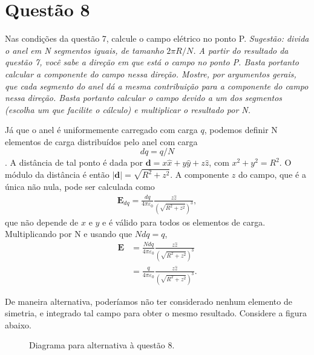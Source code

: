 \documentclass[11pt]{article}
\begin{document}
\section{Questão 8}
\label{sec:orgd01e726}
Nas condições da questão 7, calcule o campo elétrico no ponto
P. \emph{Sugestão: divida o anel em N segmentos iguais, de tamanho}
\emph{\(2\pi R/N\). A partir do resultado da questão 7, você sabe a direção em}
\emph{que está o campo no ponto P. Basta portanto calcular a componente do}
\emph{campo nessa direção. Mostre, por argumentos gerais, que cada segmento do}
\emph{anel dá a mesma contribuição para a componente do campo nessa}
\emph{direção. Basta portanto calcular o campo devido a um dos segmentos}
\emph{(escolha um que facilite o cálculo) e multiplicar o resultado por N.}

Já que o anel é uniformemente carregado com carga \(q\), podemos definir N
elementos de carga distribuídos pelo anel com carga $$ dq = q/N$$. A
distância de tal ponto é dada por \(\mathbf d = x\hat x+y\hat y+z\hat z\),
com \(x^2+y^2 = R^2\). O módulo da distância é então \(|\mathbf
d|=\sqrt{R^2+z^2}\). A componente \(\hat z\) do campo, que é a única não
nula, pode ser calculada como
\begin{align*}
  \mathbf E_{dq} = \frac{dq}{4\pi\varepsilon_0}\frac{z\hat z}{(\sqrt{R^2+z^2})^3},
\end{align*}
que não depende de \(x\) e \(y\) e é válido para todos os elementos de
carga. Multiplicando por N e usando que \(Ndq = q\),
\begin{align*}
  \mathbf E &= \frac{Ndq}{4\pi\varepsilon_0}\frac{z\hat z}{(\sqrt{R^2+z^2})^3}\\
            &= \frac{q}{4\pi\varepsilon_0}\frac{z\hat z}{(\sqrt{R^2+z^2})^3}.
\end{align*}

De maneira alternativa, poderíamos não ter considerado nenhum elemento
de simetria, e integrado tal campo para obter o mesmo
resultado. Considere a figura abaixo.
\begin{figure}[h!]
  \centering
  \caption{Diagrama para alternativa à questão 8.}
  \label{fig:ex-8}
\end{figure}
\end{document}
